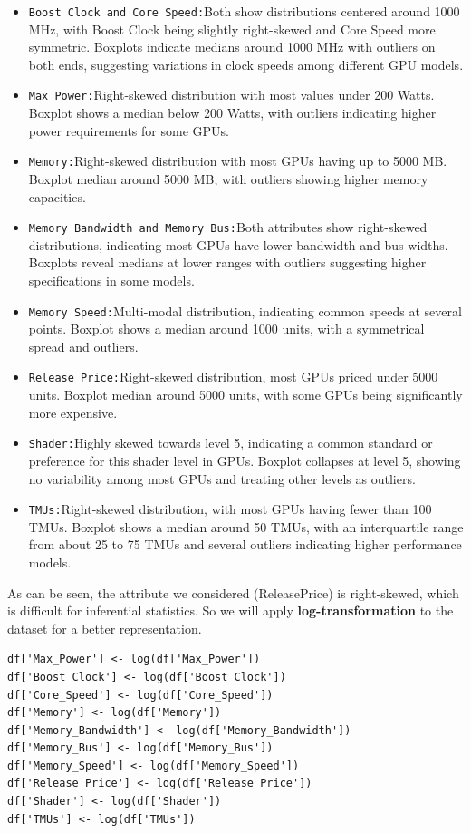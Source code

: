 \documentclass[a4paper]{article}
\theoremstyle{definition}
\begin{document}
\begin{itemize}
    \item \verb|Boost Clock and Core Speed:|Both show distributions centered around 1000 MHz, with Boost Clock being slightly right-skewed and Core Speed more symmetric. Boxplots indicate medians around 1000 MHz with outliers on both ends, suggesting variations in clock speeds among different GPU models.
    \item \verb|Max Power:|Right-skewed distribution with most values under 200 Watts. Boxplot shows a median below 200 Watts, with outliers indicating higher power requirements for some GPUs.
    \item \verb|Memory:|Right-skewed distribution with most GPUs having up to 5000 MB. Boxplot median around 5000 MB, with outliers showing higher memory capacities.
    \item \verb|Memory Bandwidth and Memory Bus:|Both attributes show right-skewed distributions, indicating most GPUs have lower bandwidth and bus widths. Boxplots reveal medians at lower ranges with outliers suggesting higher specifications in some models.
    \item \verb|Memory Speed:|Multi-modal distribution, indicating common speeds at several points. Boxplot shows a median around 1000 units, with a symmetrical spread and outliers.
    \item \verb|Release Price:|Right-skewed distribution, most GPUs priced under 5000 units. Boxplot median around 5000 units, with some GPUs being significantly more expensive.
    \item \verb|Shader:|Highly skewed towards level 5, indicating a common standard or preference for this shader level in GPUs. Boxplot collapses at level 5, showing no variability among most GPUs and treating other levels as outliers.
    \item \verb|TMUs:|Right-skewed distribution, with most GPUs having fewer than 100 TMUs. Boxplot shows a median around 50 TMUs, with an interquartile range from about 25 to 75 TMUs and several outliers indicating higher performance models.
\end{itemize}
As can be seen, the attribute we considered (Release\textunderscore Price) is right-skewed, which is difficult for inferential statistics. So we will apply \textbf{log-transformation} to the dataset for a better representation.
\begin{mdframed}[leftline=false,rightline=false,backgroundcolor=lightblue!10,nobreak=false]
    \begin{verbatim}
df['Max_Power'] <- log(df['Max_Power'])
df['Boost_Clock'] <- log(df['Boost_Clock'])
df['Core_Speed'] <- log(df['Core_Speed'])
df['Memory'] <- log(df['Memory'])
df['Memory_Bandwidth'] <- log(df['Memory_Bandwidth'])
df['Memory_Bus'] <- log(df['Memory_Bus'])
df['Memory_Speed'] <- log(df['Memory_Speed'])
df['Release_Price'] <- log(df['Release_Price'])
df['Shader'] <- log(df['Shader'])
df['TMUs'] <- log(df['TMUs'])
    \end{verbatim}
\end{mdframed}
\end{document}
